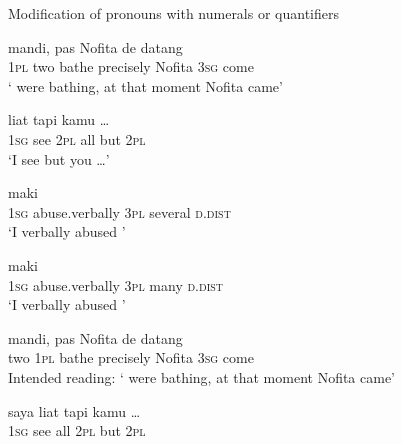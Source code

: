 \begin{styleExampleTitle}
Modification of pronouns with numerals or quantifiers
\end{styleExampleTitle}

\ea
\label{Example_6.16}
 {} {mandi,} {pas} {Nofita} {de} {datang}\\ %
 \textsc{1pl}  two  bathe  precisely  Nofita  \textsc{3sg}  come\\

\glt
‘ were bathing, at that moment Nofita came’ \textstyleExampleSource{[081025-006-Cv.0326]}
\z

\ea
\label{Example_6.17}
 {liat} {} {} {tapi} {kamu} {\ldots}\\ %
 \textsc{1sg}  see  \textsc{2pl}  all  but  \textsc{2pl}  \\

\glt
‘I see  but you {\ldots}’ \textstyleExampleSource{[080921-006-CvNP.0006]}
\z

\ea
\label{Example_6.18}
 {maki} {} {} {}\\ %
 \textsc{1sg}  abuse.verbally  \textsc{3pl}  several  \textsc{d.dist}\\

\glt
‘I verbally abused ’ \textstyleExampleSource{[080923-008-Cv.0012]}
\z

\ea
\label{Example_6.19}
 {maki} {} {} {}\\ %
 \textsc{1sg}  abuse.verbally  \textsc{3pl}  many  \textsc{d.dist}\\

\glt
‘I verbally abused ’ \textstyleExampleSource{[Elicited BR111021.024]}
\z

\ea
\label{Example_6.20}
\gll {*} {} {} {mandi,} {pas} {Nofita} {de} {datang}\\ %
 { }  two  \textsc{1pl}  bathe  precisely  Nofita  \textsc{3sg}  come\\

\glt
Intended reading: ‘ were bathing, at that moment Nofita came’ \textstyleExampleSource{[Elicited ME151112.001]}
\z

\ea
\label{Example_6.21}
\gll {*} {saya} {liat} {} {} {tapi} {kamu} {\ldots}\\ %
 { }   \textsc{1sg}  see  all  \textsc{2pl}  but  \textsc{2pl}  \\

